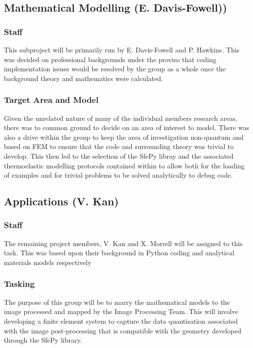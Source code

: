 \documentclass[11pt]{meetingmins}
\begin{document}
	\subsection{Mathematical Modelling {\rm (E. Davis-Fowell)})}
	\subsubsection{Staff}
	This subproject will be primarily run by E. Davis-Fowell and P. Hawkins. This was decided on professional backgrounds under the proviso that coding implementation issues would be resolved by the group as a whole once the background theory and mathematics were calculated.
	
	\subsubsection{Target Area and Model}
	Given the unrelated nature of many of the individual members research areas, there was to common ground to decide on an area of interest to model. There was also a drive within the group to keep the area of investigation non-quantum and based on FEM to ensure that the code and surrounding theory was trivial to develop. This then led to the selection of the SfePy libray and the associated thermoelastic modelling protocols contained within to allow both for the loading of examples and for trivial problems to be solved analytically to debug code.
	
	\subsection{Applications {\rm(V. Kan)}}
	\subsubsection{Staff}
	The remaining project members, V. Kan and X. Morrell will be assigned to this task. This was based upon their background in Python coding and analytical materials models respectively
	
	\subsubsection{Tasking}
	The purpose of this group will be to marry the mathematical models to the image processed and mapped by the Image Processing Team. This will involve developing a finite element system to capture the data quantisation associated with the image post-processing that is compatible with the geometry developed through the SfePy library.
	
\end{document}
